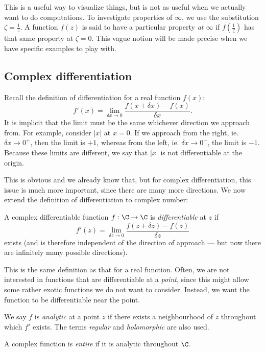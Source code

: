 \documentclass[a4paper]{article}
\begin{document}
This is a useful way to visualize things, but is not as useful when we actually want to do computations. To investigate properties of $\infty$, we use the substitution $\zeta = \frac{1}{z}$. A function $f(z)$ is said to have a particular property \emph{at $\infty$} if $f(\frac{1}{\zeta})$ has that same property at $\zeta = 0$. This vague notion will be made precise when we have specific examples to play with.

\subsection{Complex differentiation}
Recall the definition of differentiation for a real function $f(x)$:
\[
  f'(x) = \lim_{\delta x \to 0} \frac{f(x + \delta x) - f(x)}{\delta x}.
\]
It is implicit that the limit must be the same whichever direction we approach from. For example, consider $|x|$ at $x = 0$. If we approach from the right, ie. $\delta x \to 0^+$, then the limit is $+1$, whereas from the left, ie. $\delta x \to 0^-$, the limit is $-1$. Because these limits are different, we say that $|x|$ is not differentiable at the origin.

This is obvious and we already know that, but for complex differentiation, this issue is much more important, since there are many more directions. We now extend the definition of differentiation to complex number:
\begin{defi}
  A complex differentiable function $f: \C \to \C$ is \emph{differentiable} at $z$ if
  \[
    f'(z) = \lim_{\delta z \to 0} \frac{f(z + \delta z) - f(z)}{\delta z}
  \]
  exists (and is therefore independent of the direction of approach --- but now there are infinitely many possible directions).
\end{defi}
This is the same definition as that for a real function. Often, we are not interested in functions that are differentiable at a \emph{point}, since this might allow some rather exotic functions we do not want to consider. Instead, we want the function to be differentiable near the point.

\begin{defi}
  We say $f$ is \emph{analytic} at a point $z$ if there exists a neighbourhood of $z$ throughout which $f'$ exists. The terms \emph{regular} and \emph{holomorphic} are also used.
\end{defi}

\begin{defi}
  A complex function is \emph{entire} if it is analytic throughout $\C$.
\end{defi}
\end{document}
